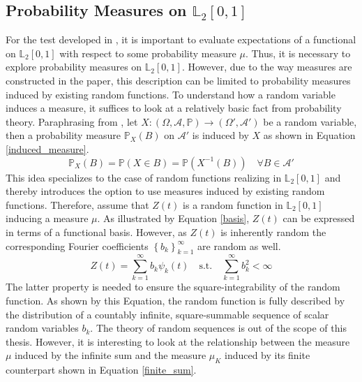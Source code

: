 \documentclass[12pt, a4paper]{article}
\theoremstyle{MAstyle} \newtheorem{assumption}{Assumption}[section]
\theoremstyle{MAstyle} \newtheorem{definition}{Definition}[section]
\theoremstyle{MAstyle} \newtheorem{theorem}{Theorem}[section]
\begin{document}
		\subsection{Probability Measures on $\mathbb{L}_2[0,1]$}\label{prob_measures_l2}
			For the test developed in \cite{bugni_permutation_2021}, it is important to evaluate expectations of a functional on $\mathbb{L}_2[0,1]$ with respect to some probability measure $\mu$. Thus, it is necessary to explore probability measures on $\mathbb{L}_2[0,1]$. However, due to the way measures are constructed in the paper, this description can be limited to probability measures induced by existing random functions. 
			To understand how a random variable induces a measure, it suffices to look at a relatively basic fact from probability theory. Paraphrasing from \cite{bauer_probability_2011}, let $X:\left(\Omega, \mathcal{A}, \mathbb{P}\right) \rightarrow \left(\Omega', \mathcal{A}'\right)$ be a random variable, then a probability measure $\mathbb{P}_X(B)$ on $\mathcal{A}'$ is induced by $X$ as shown in Equation \ref{induced_measure}.
			\begin{equation}\label{induced_measure}
				\mathbb{P}_X(B) = \mathbb{P}(X \in B) = \mathbb{P}(X^{-1}(B)) \quad \forall B \in \mathcal{A}'
			\end{equation}
			This idea specializes to the case of random functions realizing in $\mathbb{L}_2[0,1]$ and thereby introduces the option to use measures induced by existing random functions.
			Therefore, assume that $Z(t)$ is a random function in $\mathbb{L}_2[0,1]$ inducing a measure $\mu$. As illustrated by Equation \ref{basis}, $Z(t)$ can be expressed in terms of a functional basis. However, as $Z(t)$ is inherently random the corresponding Fourier coefficients $\left\{b_k\right\}_{k = 1}^{\infty}$ are random as well.
			\begin{equation}
				Z(t) = \sum_{k = 1}^{\infty} b_k \psi_k(t) \quad \text{s.t.} \quad \sum_{k = 1}^{\infty} b_k^2 < \infty
			\end{equation}
			The latter property is needed to ensure the square-integrability of the random function. As shown by this Equation, the random function is fully described by the distribution of a countably infinite, square-summable sequence of scalar random variables $b_k$. The theory of random sequences is out of the scope of this thesis. However, it is interesting to look at the relationship between the measure $\mu$ induced by the infinite sum and the measure $\mu_K$ induced by its finite counterpart shown in Equation \ref{finite_sum}.
\end{document}
